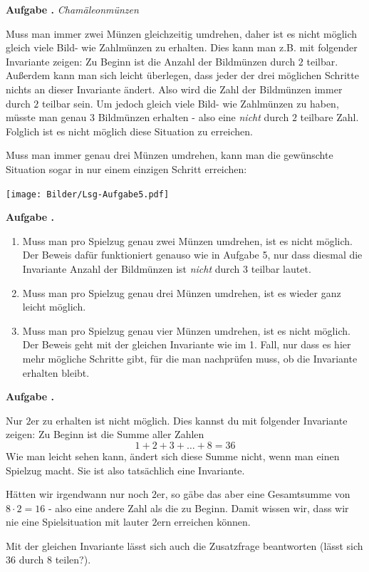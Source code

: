 \documentclass[a4paper,ngerman,12pt]{scrartcl}
\theoremstyle{definition}
\theoremstyle{plain}
\theoremstyle{remark}
\newlength{\aufgabenskip}
\newcounter{aufgabennummer}
\newenvironment{aufgabe}[1]{
	\addtocounter{aufgabennummer}{1}
	\textbf{Aufgabe \theaufgabennummer.} \emph{#1} \par
}{\vspace{\aufgabenskip}}
\begin{document}
\newpage
\begin{aufgabe}{Chamäleonmünzen}
	Muss man immer zwei Münzen gleichzeitig umdrehen, daher ist es nicht möglich gleich viele Bild- wie Zahlmünzen zu erhalten. Dies kann man z.B. mit folgender Invariante zeigen: Zu Beginn ist die Anzahl der Bildmünzen durch $2$ teilbar. Außerdem kann man sich leicht überlegen, dass jeder der drei möglichen Schritte nichts an dieser Invariante ändert. Also wird die Zahl der Bildmünzen immer durch $2$ teilbar sein. Um jedoch gleich viele Bild- wie Zahlmünzen zu haben, müsste man genau $3$ Bildmünzen erhalten - also eine \emph{nicht} durch $2$ teilbare Zahl. Folglich ist es nicht möglich diese Situation zu erreichen.
	
	Muss man immer genau drei Münzen umdrehen, kann man die gewünschte Situation sogar in nur einem einzigen Schritt erreichen:
	\begin{center}
		\texttt{[image: Bilder/Lsg-Aufgabe5.pdf]}
	\end{center}		
\end{aufgabe}

\begin{aufgabe}{}
	\begin{enumerate}
		\item Muss man pro Spielzug genau zwei Münzen umdrehen, ist es nicht möglich. Der Beweis dafür funktioniert genauso wie in Aufgabe 5, nur dass diesmal die Invariante \glqq Anzahl der Bildmünzen ist \emph{nicht} durch $3$ teilbar\grqq{} lautet.
		\item Muss man pro Spielzug genau drei Münzen umdrehen, ist es wieder ganz leicht möglich.
		\item Muss man pro Spielzug genau vier Münzen umdrehen, ist es nicht möglich. Der Beweis geht mit der gleichen Invariante wie im 1. Fall, nur dass es hier mehr mögliche Schritte gibt, für die man nachprüfen muss, ob die Invariante erhalten bleibt.
	\end{enumerate}
\end{aufgabe}

\begin{aufgabe}{}
Nur $2$er zu erhalten ist nicht möglich. Dies kannst du mit folgender Invariante zeigen: Zu Beginn ist die Summe aller Zahlen 
\[1+2+3+ \dots + 8 = 36\]
Wie man leicht sehen kann, ändert sich diese Summe nicht, wenn man einen Spielzug macht. Sie ist also tatsächlich eine Invariante.

Hätten wir irgendwann nur noch $2$er, so gäbe das aber eine Gesamtsumme von $8\cdot 2 = 16$ - also eine andere Zahl als die zu Beginn. Damit wissen wir, dass wir nie eine Spielsituation mit lauter $2$ern erreichen können.

Mit der gleichen Invariante lässt sich auch die Zusatzfrage beantworten (lässt sich $36$ durch $8$ teilen?).

\end{aufgabe}
\end{document}
